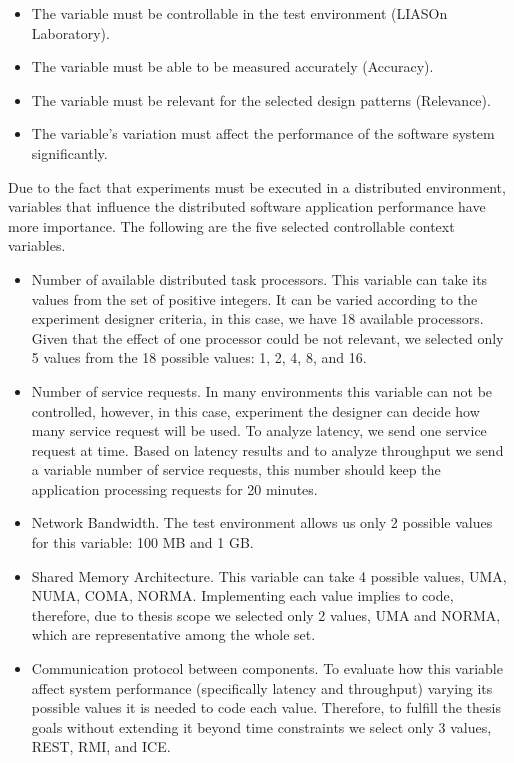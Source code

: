 \begin{itemize}
	\item The variable must be controllable in the test environment (LIASOn Laboratory).
	\item The variable must be able to be measured accurately (Accuracy).
	\item The variable must be relevant for the selected design patterns (Relevance).
	\item The variable's variation must affect the performance of the software system significantly.
\end{itemize}

Due to the fact that experiments must be executed in a distributed environment, variables that influence the distributed software application performance have more importance. The following are the five selected controllable context variables. 

\begin{itemize}
	\item Number of available distributed task processors.
		This variable can take its values from the set of positive integers. It can be varied according to the experiment designer criteria, in this case, we have 18 available processors. Given that the effect of one processor could be not relevant, we selected only 5 values from the 18 possible values: 1, 2, 4, 8, and 16. 
	\item Number of service requests.
		In many environments this variable can not be controlled, however, in this case, experiment the designer can decide how many service request will be used. To analyze latency, we send one service request at time. Based on latency results and to analyze throughput we send a variable number of service requests, this number should keep the application processing requests for 20 minutes.
	\item Network Bandwidth.
		The test environment allows us only 2 possible values for this variable: 100 MB and 1 GB.
	\item Shared Memory Architecture.
		This variable can take 4 possible values, UMA, NUMA, COMA, NORMA. Implementing each value implies to code, therefore, due to thesis scope we selected only 2 values, UMA and NORMA, which are representative among the whole set.
	\item Communication protocol between components.
		To evaluate how this variable affect system performance (specifically latency and throughput) varying its possible values it is needed to code each value. Therefore, to fulfill the thesis goals without extending it beyond time constraints we select only 3 values, REST, RMI, and ICE.
\end{itemize}


